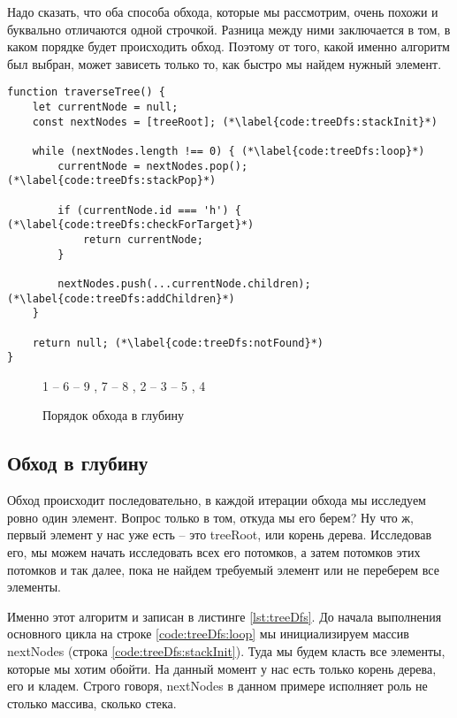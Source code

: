 \documentclass[../../article]{subfiles}
\begin{document}
Надо сказать, что оба способа обхода, которые мы рассмотрим, очень похожи и буквально отличаются одной строчкой. Разница между ними заключается в том, в каком порядке будет происходить обход. Поэтому от того, какой именно алгоритм был выбран, может зависеть только то, как быстро мы найдем нужный элемент.

\begin{figure*}
    \begin{ruledelement}
        \begin{lstlisting}[caption={Обход дерева в глубину}, label={lst:treeDfs}]
function traverseTree() {
    let currentNode = null;
    const nextNodes = [treeRoot]; (*\label{code:treeDfs:stackInit}*)

    while (nextNodes.length !== 0) { (*\label{code:treeDfs:loop}*)
        currentNode = nextNodes.pop(); (*\label{code:treeDfs:stackPop}*)

        if (currentNode.id === 'h') { (*\label{code:treeDfs:checkForTarget}*)
            return currentNode;
        }

        nextNodes.push(...currentNode.children); (*\label{code:treeDfs:addChildren}*)
    }

    return null; (*\label{code:treeDfs:notFound}*)
}
        \end{lstlisting}
    \end{ruledelement}
\end{figure*}

\begin{figure}
    \styledgraph
    {
        1 -- { 6 -- { 9 , 7 -- 8 }, 2 -- 3 -- { 5 , 4 }}
    }
    \caption{Порядок обхода в глубину}
    \label{fig:treeDfsOrder}
\end{figure}

\subsection{Обход в глубину}

Обход происходит последовательно, в каждой итерации обхода мы исследуем ровно один элемент. Вопрос только в том, откуда мы его берем? Ну что ж, первый элемент у нас уже есть – это {\firacodebold treeRoot}, или корень дерева. Исследовав его, мы можем начать исследовать всех его потомков, а затем потомков этих потомков и так далее, пока не найдем требуемый элемент или не переберем все элементы.

Именно этот алгоритм и записан в листинге \ref{lst:treeDfs}. До начала выполнения основного цикла на строке \ref{code:treeDfs:loop} мы инициализируем массив {\firacodebold nextNodes} (строка \ref{code:treeDfs:stackInit}). Туда мы будем класть все элементы, которые мы хотим обойти. На данный момент у нас есть только корень дерева, его и кладем. Строго говоря, {\firacodebold nextNodes} в данном примере исполняет роль не столько массива, сколько {\firacodebold стека}.
\end{document}
